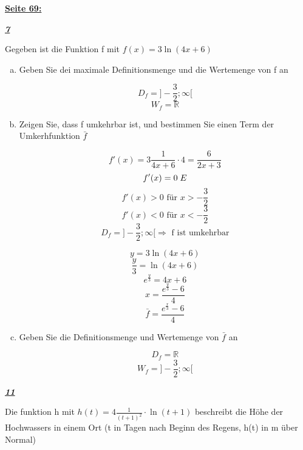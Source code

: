 \documentclass{article}
\begin{document}
\underline{\textbf{Seite 69:}}

\underline{\textit{\textbf{7}}}

Gegeben ist die Funktion f mit $ f(x) = 3 \ln(4x+6)$
\begin{enumerate}[a)]
\item Geben Sie dei maximale Definitionsmenge und die Wertemenge von f an

\[D_f = ]-\frac 32;\infty[\]
\[W_f = \mathbb{R}\]

\item Zeigen Sie, dass f umkehrbar ist, und bestimmen Sie einen Term der Umkerhfunktion $\bar f$

\[f'(x) = 3 \frac 1 {4x+6} \cdot 4 = \frac 6 {2x+3}\]
\[f'(x) = 0 \; \Lightning\]
\[ f'(x) > 0 \text{ für } x > -\frac 32\]
\[f'(x) < 0 \text{ für } x < -\frac 32\]
\[D_f = ]-\frac 32;\infty[ \Rightarrow \text{ f ist umkehrbar}\]

\[y = 3 \ln(4x+6)\]
\[\frac y3 = \ln(4x+6)\]
\[e^{\frac y3} = 4x+6\]
\[x = \frac {e^{\frac y3}-6}4\]
\[\bar f = \frac {e^{\frac x3}-6}4\]

\item Geben Sie die Definitionsmenge und Wertemenge von $\bar f$ an

\[D_f = \mathbb{R}\]
\[W_f = ]-\frac 32;\infty[\]

\end{enumerate}



\underline{\textit{\textbf{11}}}

Die funktion h mit $h(t) = 4\frac 1{(t+1)^2}\cdot \ln(t+1)$ beschreibt die Höhe der Hochwassers in einem Ort (t in Tagen nach Beginn des Regens, h(t) in m über Normal)
\end{document}
